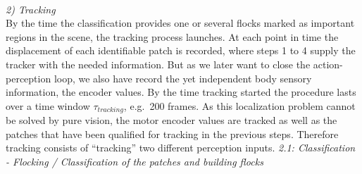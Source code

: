 %
%
\\ \newline
%
%
\textit{2) Tracking}\\ \newline
By the time the classification provides one or several flocks marked as important regions in the scene, the tracking process launches. At each point in time the displacement of each identifiable patch is recorded, where steps 1 to 4 supply the tracker with the needed information. But as we later want to close the action-perception loop, we also have record the yet independent body sensory information, the encoder values. By the time tracking started the procedure lasts over a time window $\tau_{tracking}$, e.g.\ 200 frames.
%
As this localization problem cannot be solved by pure vision, the motor encoder values are tracked as well as the patches that have been qualified for tracking in the previous steps. Therefore tracking consists of ``tracking'' two different perception inputs.
\textit{2.1: Classification - Flocking / Classification of the patches and building flocks} \\ \newline

